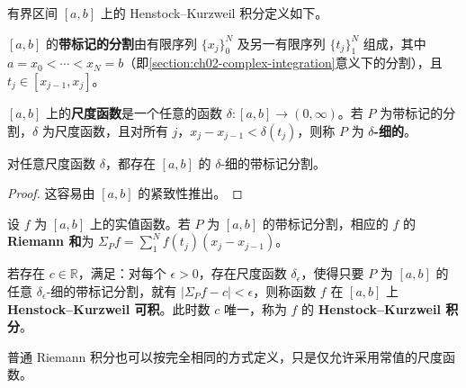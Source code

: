 \documentclass[../../main.tex]{subfiles}%
\begin{document}
有界区间 $[a,b]$ 上的 Henstock–Kurzweil 积分定义如下。
\begin{definition}[带标记的分割]\label{definition:ch02-tagged-partition}
$[a,b]$ 的\textbf{带标记的分割}由有限序列 $\{x_j\}_0^N$ 及另一有限序列 $\{t_j\}_1^N$ 组成，其中 $a=x_0<\cdots<x_N=b$（即\cref{section:ch02-complex-integration}意义下的分割），且 $t_j\in[x_{j-1},x_j]$。
\end{definition}
\begin{definition}[尺度函数]\label{definition:ch02-gauge}
$[a,b]$ 上的\textbf{尺度函数}是一个任意的函数 $\delta:[a,b]\to(0,\infty)$。若 $P$ 为带标记的分割，$\delta$ 为尺度函数，且对所有 $j$，$x_j-x_{j-1}<\delta(t_j)$，则称 $P$ 为 \textbf{$\delta$-细的}。
\end{definition}
\begin{proposition}\label{proposition:ch02-fine-partition-existence}
对任意尺度函数 $\delta$，都存在 $[a,b]$ 的 $\delta$-细的带标记分割。
\end{proposition}
\begin{proof}
这容易由 $[a,b]$ 的紧致性推出。
\end{proof}
\begin{definition}\label{definition:ch02-tagged-riemann-sum}
设 $f$ 为 $[a,b]$ 上的实值函数。若 $P$ 为 $[a,b]$ 的带标记分割，相应的 $f$ 的 \textbf{Riemann 和}为 $\Sigma_Pf=\sum_1^N f(t_j)(x_j-x_{j-1})$。
\end{definition}
\begin{definition}\label{definition:ch02-henstock-kurzweil-integral}
若存在 $c\in\mathbb{R}$，满足：对每个 $\epsilon>0$，存在尺度函数 $\delta_\epsilon$，使得只要 $P$ 为 $[a,b]$ 的任意 $\delta_\epsilon$-细的带标记分割，就有 $|\Sigma_Pf-c|<\epsilon$，则称函数 $f$ 在 $[a,b]$ 上 \textbf{Henstock–Kurzweil 可积}。此时数 $c$ 唯一，称为 $f$ 的 \textbf{Henstock–Kurzweil 积分}。
\end{definition}
\begin{remark}
普通 Riemann 积分也可以按完全相同的方式定义，只是仅允许采用常值的尺度函数。
\end{remark}
\end{document}
